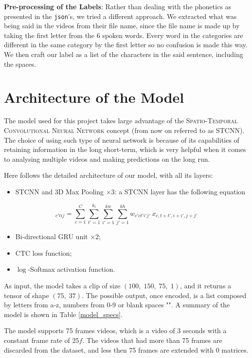 \documentclass[11pt,journal]{IEEEtran}
\newcommand{\nl}{

\medskip

}
\begin{document}
\textbf{Pre-processing of the Labels}: Rather than dealing with the phonetics as presented in the \texttt{json}'s, we tried a different approach. We extracted what was being said in the videos from their file name, since the file name is made up by taking the first letter from the 6 spoken words. Every word in the categories are different in the same category by the first letter so no confusion is made this way. We then craft our label as a list of the characters in the said sentence, including the spaces.

\section{Architecture of the Model}

The model used for this project takes large advantage of the \textsc{Spatio-Temporal Convolutional Neural Network} concept \cite{gunileo:stcnn} (from now on referred to as STCNN). The choice of using such type of neural network is because of its capabilities of retaining information in the long short-term, which is very helpful when it comes to analysing multiple videos and making predictions on the long run.
\nl
Here follows the detailed architecture of our model, with all its layers:
\begin{itemize}
    \item STCNN and 3D Max Pooling $\times 3$: a STCNN layer has the following equation
\end{itemize}
    \begin{equation}
        [\text{stconv}(\mathbf{x},\mathbf{w})]_{c'tij} = \sum_{c = 1}^C \sum_{t' = 1}^{k_t} \sum_{i' = 1}^{kw} \sum_{j' = 1}^{kh} w_{c'ct'i'j'} \: x_{c,t+t',i+i',j+j'}
    \end{equation}
\begin{itemize}
    \item Bi-directional GRU unit $\times 2$;
    \item CTC loss function;
    \item $\log$-Softmax activation function.
\end{itemize}

\nl
As input, the model takes a clip of size $(100, \; 150, \; 75, \; 1)$, and it returns a tensor of shape $(75, \; 37)$. The possible output, once encoded, is a list composed by letters from a-z, numbers from 0-9 or blank spaces "\textvisiblespace". A summary of the model is shown in Table \ref{model_specs}.
\nl
The model supports 75 frames videos, which is a video of 3 seconds with a constant frame rate of 25$f$. The videos that had more than 75 frames are discarded from the dataset, and less then 75 frames are extended with 0 matrices.
\end{document}
